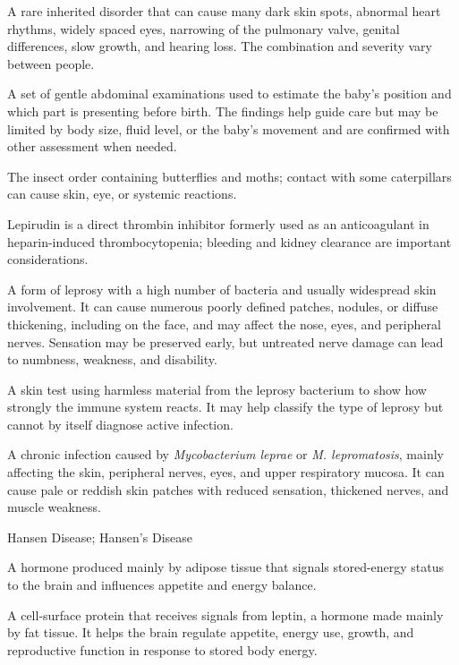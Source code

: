  A rare inherited disorder that can cause many dark skin spots, abnormal heart rhythms, widely spaced eyes, narrowing of the pulmonary valve, genital differences, slow growth, and hearing loss. The combination and severity vary between people.

 A set of gentle abdominal examinations used to estimate the baby’s position and which part is presenting before birth. The findings help guide care but may be limited by body size, fluid level, or the baby’s movement and are confirmed with other assessment when needed.

 The insect order containing butterflies and moths; contact with some caterpillars can cause skin, eye, or systemic reactions.

 Lepirudin is a direct thrombin inhibitor formerly used as an anticoagulant in heparin-induced thrombocytopenia; bleeding and kidney clearance are important considerations.

 A form of leprosy with a high number of bacteria and usually widespread skin involvement. It can cause numerous poorly defined patches, nodules, or diffuse thickening, including on the face, and may affect the nose, eyes, and peripheral nerves. Sensation may be preserved early, but untreated nerve damage can lead to numbness, weakness, and disability.

 A skin test using harmless material from the leprosy bacterium to show how strongly the immune system reacts. It may help classify the type of leprosy but cannot by itself diagnose active infection.

 A chronic infection caused by \textit{Mycobacterium leprae} or \textit{M. lepromatosis}, mainly affecting the skin, peripheral nerves, eyes, and upper respiratory mucosa. It can cause pale or reddish skin patches with reduced sensation, thickened nerves, and muscle weakness.

\synonyms
Hansen Disease; Hansen's Disease

 A hormone produced mainly by adipose tissue that signals stored-energy status to the brain and influences appetite and energy balance.

 A cell-surface protein that receives signals from leptin, a hormone made mainly by fat tissue. It helps the brain regulate appetite, energy use, growth, and reproductive function in response to stored body energy.

